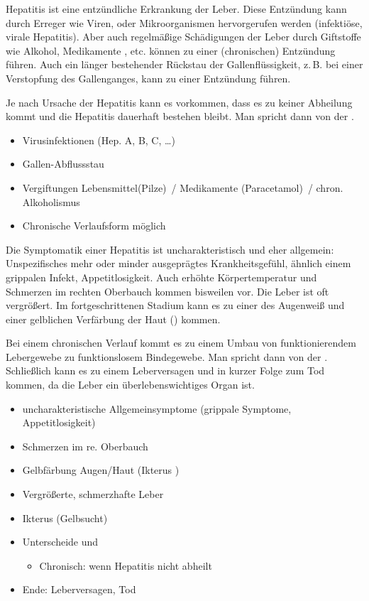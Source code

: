 {%
Hepatitis ist eine
entzündliche Erkrankung der Leber. Diese Entzündung kann
durch Erreger wie Viren, oder Mikroorganismen hervorgerufen
werden (infektiöse, virale Hepatitis). Aber auch regelmäßige
Schädigungen der Leber durch Giftstoffe wie Alkohol,
Medikamente , etc. können zu einer
(chronischen) Entzündung führen. Auch ein länger bestehender
Rückstau der Gallenflüssigkeit, z.\,B. bei einer Verstopfung
des Gallenganges, kann zu einer Entzündung führen.

Je nach Ursache der Hepatitis kann es vorkommen, dass es zu
keiner Abheilung kommt und die Hepatitis dauerhaft bestehen
bleibt. Man spricht dann von der .} 
{
\begin{itemize}
  \item Virusinfektionen (Hep. A, B, C, \ldots )
  \item Gallen-Abflussstau
  \item Vergiftungen Lebensmittel(Pilze)~/
  Medikamente (Paracetamol)~/ chron. Alkoholismus
  \item Chronische Verlaufsform möglich
\end{itemize}
}{}{}{}

{%
Die Symptomatik einer Hepatitis ist uncharakteristisch und
eher allgemein: Unspezifisches mehr oder minder ausgeprägtes
Krankheitsgefühl, ähnlich einem grippalen Infekt,
Appetitlosigkeit. Auch erhöhte Körpertemperatur und
Schmerzen im rechten Oberbauch kommen bisweilen vor. Die
Leber ist oft
vergrößert.
Im
fortgeschrittenen Stadium kann es zu einer 
des Augenweiß und einer gelblichen Verfärbung der Haut
() kommen. 

Bei einem chronischen
Verlauf kommt es zu einem Umbau von
funktionierendem Lebergewebe zu
funktionslosem Bindegewebe. Man spricht
dann von der
\label{topic:leberzirrhose}.
Schließlich kann es zu einem Leberversagen und in kurzer
Folge zum Tod kommen, da die Leber ein überlebenswichtiges
Organ ist. 
}{
\begin{itemize}
  \item uncharakteristische Allgemeinsymptome (grippale Symptome,
  Appetitlosigkeit)
  \item Schmerzen im re. Oberbauch
  \item Gelbfärbung Augen/Haut (Ikterus )
  \item Vergrößerte, schmerzhafte Leber
  \item Ikterus (Gelbsucht)
  \item Unterscheide  und
  \begin{itemize}
    \item Chronisch: wenn Hepatitis nicht abheilt
  \end{itemize}
  \item Ende: Leberversagen, Tod
\end{itemize}
}{}{}{}



